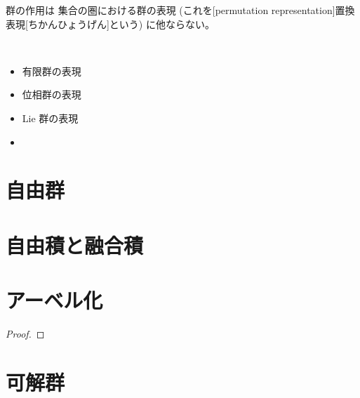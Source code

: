 \documentclass[report]{jlreq}
\begin{document}
\begin{remark}
    群の作用は
    集合の圏における群の表現
    (これを[permutation representation]{置換表現}[ちかんひょうげん]という)
    に他ならない。
\end{remark}

\begin{example}
    ~
    \begin{itemize}
        \item 有限群の表現
        \item 位相群の表現
        \item Lie 群の表現
        \item \TODO{}
    \end{itemize}
\end{example}

%
\section{自由群}

%
\section{自由積と融合積}

%
\section{アーベル化}

\begin{theorem}[アーベル化の普遍性]
    \TODO{}
\end{theorem}

\begin{proof}
    \TODO{}
\end{proof}

%
\section{可解群}
\end{document}
